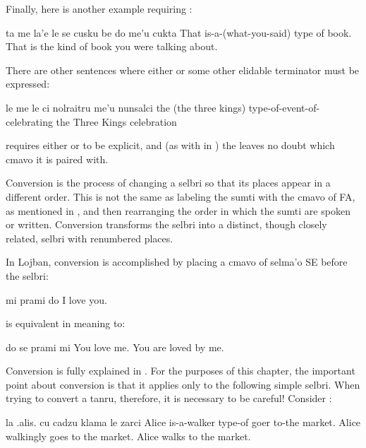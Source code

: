 Finally, here is another example requiring :
\begin{example}
ta me la'e le se cusku be do me'u cukta\n
That  is-a-(what-you-said) type of book.\n
That is the kind of book you were talking about.
\end{example}

There are other sentences where either  or some
    other elidable terminator must be expressed:
\begin{example}
le me le ci nolraitru  me'u nunsalci\n
the (the three kings) type-of-event-of-celebrating\n
the Three Kings celebration
\end{example}

{\noindent}requires either  or  to be explicit, and (as with
     in ) the  leaves no
    doubt which cmavo it is paired with.



Conversion is the process of changing a selbri so that its
    places appear in a different order. This is not the same as
    labeling the sumti with the cmavo of FA, as mentioned in , and then rearranging the order in
    which the sumti are spoken or written. Conversion transforms
    the selbri into a distinct, though closely related, selbri with
    renumbered places.

In Lojban, conversion is accomplished by placing a cmavo of
    selma'o SE before the selbri:

\begin{example}
mi prami do\n
I love you.
\end{example}

{\noindent}is equivalent in meaning to:
\begin{example}
do se prami mi\n
You  love me.\n
You are loved by me.
\end{example}

Conversion is fully explained in . For the purposes of this
    chapter, the important point about conversion is that it
    applies only to the following simple selbri. When trying to
    convert a tanru, therefore, it is necessary to be careful!
    Consider :
\begin{example}
la .alis. cu cadzu klama le zarci\n
Alice is-a-walker type-of goer to-the market.\n
Alice walkingly goes to the market.\n
Alice walks to the market.
\end{example}

